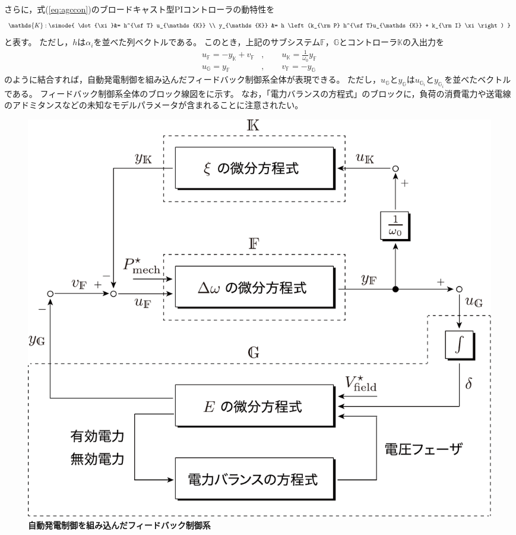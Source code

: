 \documentclass[tombow,dvipdfmx]{corona-a5-1.1}
\begin{document}
さらに，式(\ref{eq:agccon})のブロードキャスト型PIコントローラの動特性を
\begin{align}\label{eq:condsK}
\mathds{K}: \simode{
\dot{\xi}&=  h^{\sf T} u_{\mathds{K}} \\
y_{\mathds{K}} &= h \left(k_{\rm P} h^{\sf T}u_{\mathds{K}} +  k_{\rm I} \xi \right)
}
\end{align}
と表す。
ただし，$h$は$\alpha_i$を並べた列ベクトルである。
このとき，上記のサブシステム$\mathds{F}$，$\mathds{G}$とコントローラ$\mathds{K}$の入出力を
\begin{subequations}\label{eq:connds}
\begin{align}
u_{\mathds{F}} = - y_{\mathds{K}} + v_{\mathds{F}}&
,\qquad u_{\mathds{K}} = \frac{1}{\omega_0} y_{\mathds{F}}	\label{eq:connds1}
\\
u_{\mathds{G}} = y_{\mathds{F}}&
,\qquad
v_{\mathds{F}} = - y_{\mathds{G}}		\label{eq:connds2}
\end{align}
\end{subequations}
のように結合すれば，自動発電制御を組み込んだフィードバック制御系全体が表現できる。
ただし，$u_{\mathds{G}}$と$y_{\mathds{G}}$は$u_{\mathds{G}_i}$と$y_{\mathds{G}_i}$を並べたベクトルである。
フィードバック制御系全体のブロック線図をに示す。
なお，「電力バランスの方程式」のブロックに，負荷の消費電力や送電線のアドミタンスなどの未知なモデルパラメータが含まれることに注意されたい。

\begin{figure}[t]
\centering
\includegraphics[width = .85\linewidth]{figs/nonlinBD}
\medskip
\caption{\textbf{自動発電制御を組み込んだフィードバック制御系}}
\label{fig:nonlinBD}
\medskip
\end{figure}
\end{document}
